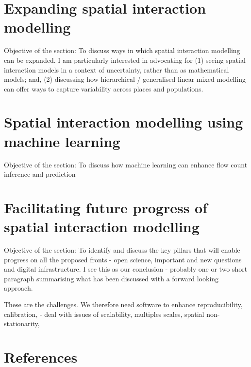 \documentclass[11pt,letterpaper]{article}
\begin{document}
\hypertarget{expanding-spatial-interaction-modelling}{%
\section{Expanding spatial interaction modelling}\label{expanding-spatial-interaction-modelling}}

Objective of the section: To discuss ways in which spatial interaction modelling can be expanded.
I am particularly interested in advocating for (1) seeing spatial interaction models in a context of uncertainty, rather than as mathematical models; and, (2) discussing how hierarchical / generalised linear mixed modelling can offer ways to capture variability across places and populations.

\hypertarget{spatial-interaction-modelling-using-machine-learning}{%
\section{Spatial interaction modelling using machine learning}\label{spatial-interaction-modelling-using-machine-learning}}

Objective of the section: To discuss how machine learning can enhance flow count inference and prediction

\hypertarget{facilitating-future-progress-of-spatial-interaction-modelling}{%
\section{Facilitating future progress of spatial interaction modelling}\label{facilitating-future-progress-of-spatial-interaction-modelling}}

Objective of the section: To identify and discuss the key pillars that will enable progress on all the proposed fronts - open science, important and new questions and digital infrastructure.
I see this as our conclusion - probably one or two short paragraph summarising what has been discussed with a forward looking approach.

These are the challenges.
We therefore need software to enhance reproducibility, calibration, - deal with issues of scalability, multiples scales, spatial non-stationarity,

\hypertarget{references}{%
\section*{References}\label{references}}
\end{document}
